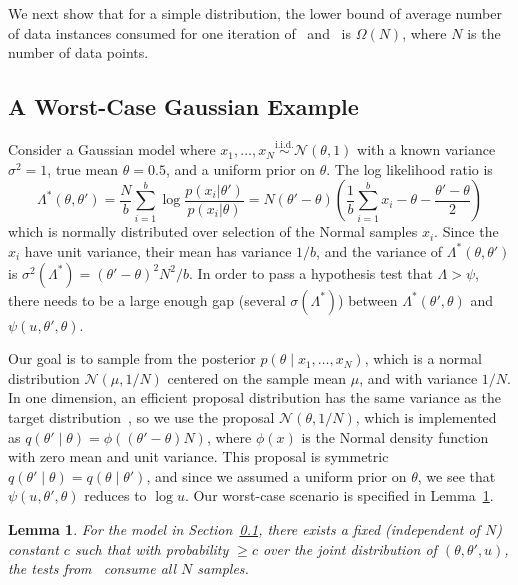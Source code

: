 \documentclass{article}
\newcommand{\simiid}{\overset{\textrm{i.i.d.}}{\sim}}
\newtheorem{lemma}{Lemma}
\begin{document}
We next show that for a simple distribution, the lower bound of average
number of data instances consumed for one iteration of~\cite{cutting_mh_2014}
and~\cite{icml2014c1_bardenet14} is $\Omega(N)$, where $N$ is the number of data
points.

\subsection{A Worst-Case Gaussian Example}\label{ssec:gaussian_example}
Consider a Gaussian model where $x_1,\ldots,x_N \simiid \mathcal{N}(\theta,1)$
with a known variance $\sigma^2=1$, true mean $\theta=0.5$, and a uniform prior
on $\theta$. The log likelihood ratio is
\begin{equation}
\Lambda^*(\theta,\theta') =  \frac{N}{b}\sum_{i=1}^b \log\frac{p(x_i|\theta')}{p(x_i|\theta)}=
  N(\theta'-\theta)\left(\frac{1}{b}\sum_{i=1}^b x_i-\theta-\frac{\theta'-\theta}{2}\right)
\end{equation}
which is normally distributed over selection of the Normal samples $x_i$.  Since
the $x_i$ have unit variance, their mean has variance $1/b$, and the variance of
$\Lambda^*(\theta,\theta')$ is $\sigma^2(\Lambda^*) = (\theta'-\theta)^2N^2/b$.
In order to pass a hypothesis test that $\Lambda > \psi$, there needs to be a
large enough gap (several $\sigma(\Lambda^*)$) between
$\Lambda^*(\theta',\theta)$ and $\psi(u,\theta',\theta)$. 

Our goal is to sample from the posterior $p(\theta \mid x_1,\ldots,x_N)$, which
is a normal distribution $\mathcal{N}(\mu, 1/N)$ centered on the sample mean
$\mu$, and with variance $1/N$. In one dimension, an efficient proposal
distribution has the same variance as the target
distribution~\cite{OptimalScaling01}, so we use the proposal
$\mathcal{N}(\theta,1/N)$, which is implemented as
$q(\theta'\mid\theta)=\phi((\theta'-\theta)N)$, where $\phi(x)$ is the Normal
density function with zero mean and unit variance. This proposal is symmetric
$q(\theta'\mid\theta)=q(\theta\mid\theta')$, and since we assumed a uniform
prior on $\theta$, we see that $\psi(u,\theta',\theta)$ reduces to $\log u$. Our
worst-case scenario is specified in Lemma~\ref{lem:worst_case}.

\begin{lemma}\label{lem:worst_case}
    For the model in Section~\ref{ssec:gaussian_example}, there exists a fixed
    (independent of $N$) constant $c$ such that with probability $\geq c$ over
    the joint distribution of $(\theta, \theta', u)$, the tests
    from~\cite{cutting_mh_2014,icml2014c1_bardenet14} consume all $N$ samples. 
\end{lemma}
\end{document}
